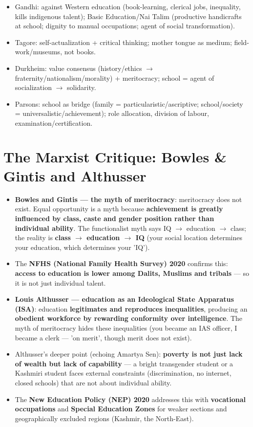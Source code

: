 \begin{QuickRevision}
\begin{itemize}
\item Gandhi: against Western education (book-learning, clerical jobs, inequality, kills indigenous talent); Basic Education/Nai Talim (productive handicrafts at school; dignity to manual occupations; agent of social transformation).
\item Tagore: self-actualization + critical thinking; mother tongue as medium; field-work/museums, not books.
\item Durkheim: value consensus (history/ethics $\rightarrow$ fraternity/nationalism/morality) + meritocracy; school = agent of socialization $\rightarrow$ solidarity.
\item Parsons: school as bridge (family = particularistic/ascriptive; school/society = universalistic/achievement); role allocation, division of labour, examination/certification.
\end{itemize}
\end{QuickRevision}

\section{The Marxist Critique: Bowles \& Gintis and Althusser}

\begin{CriticalPoint}
\begin{itemize}
\item \textbf{Bowles and Gintis --- the myth of meritocracy}: meritocracy does not exist. Equal opportunity is a myth because \textbf{achievement is greatly influenced by class, caste and gender position rather than individual ability}. The functionalist myth says IQ $\rightarrow$ education $\rightarrow$ class; the reality is \textbf{class $\rightarrow$ education $\rightarrow$ IQ} (your social location determines your education, which determines your 'IQ').
\item The \textbf{NFHS (National Family Health Survey) 2020} confirms this: \textbf{access to education is lower among Dalits, Muslims and tribals} --- so it is not just individual talent.
\item \textbf{Louis Althusser --- education as an Ideological State Apparatus (ISA)}: education \textbf{legitimates and reproduces inequalities}, producing an \textbf{obedient workforce by rewarding conformity over intelligence}. The myth of meritocracy hides these inequalities (you became an IAS officer, I became a clerk --- 'on merit', though merit does not exist).
\item Althusser's deeper point (echoing Amartya Sen): \textbf{poverty is not just lack of wealth but lack of capability} --- a bright transgender student or a Kashmiri student faces external constraints (discrimination, no internet, closed schools) that are not about individual ability.
\item The \textbf{New Education Policy (NEP) 2020} addresses this with \textbf{vocational occupations} and \textbf{Special Education Zones} for weaker sections and geographically excluded regions (Kashmir, the North-East).
\end{itemize}
\end{CriticalPoint}

